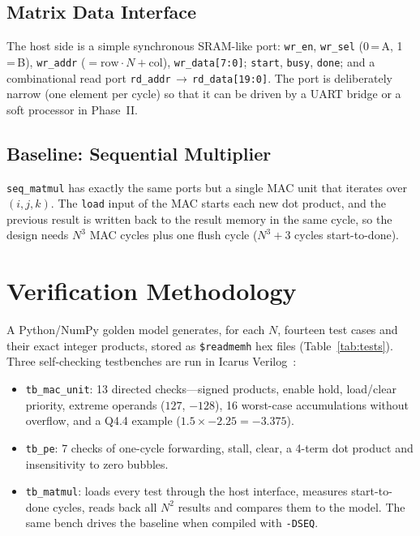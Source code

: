 \documentclass[conference]{IEEEtran}
\begin{document}
\subsection{Matrix Data Interface}
The host side is a simple synchronous SRAM-like port:
\texttt{wr\_en}, \texttt{wr\_sel} (0\,=\,A, 1\,=\,B), \texttt{wr\_addr}
($=\text{row}\cdot N+\text{col}$), \texttt{wr\_data[7:0]}; \texttt{start},
\texttt{busy}, \texttt{done}; and a combinational read port
\texttt{rd\_addr}\,$\rightarrow$\,\texttt{rd\_data[19:0]}. The port is deliberately
narrow (one element per cycle) so that it can be driven by a UART bridge or a
soft processor in Phase~II.

\subsection{Baseline: Sequential Multiplier}
\texttt{seq\_matmul} has exactly the same ports but a single MAC unit that
iterates over $(i,j,k)$. The \texttt{load} input of the MAC starts each new dot
product, and the previous result is written back to the result memory in the
same cycle, so the design needs $N^3$ MAC cycles plus one flush cycle
($N^3+3$ cycles start-to-done).

\section{Verification Methodology}
A Python/NumPy golden model generates, for each $N$, fourteen test cases and
their exact integer products, stored as \texttt{\$readmemh} hex files
(Table~\ref{tab:tests}). Three self-checking testbenches are run in Icarus
Verilog~\cite{icarus}:
\begin{itemize}
\item \texttt{tb\_mac\_unit}: 13 directed checks---signed products, enable
      hold, load/clear priority, extreme operands ($127$, $-128$), 16
      worst-case accumulations without overflow, and a Q4.4 example
      ($1.5\times-2.25=-3.375$).
\item \texttt{tb\_pe}: 7 checks of one-cycle forwarding, stall, clear, a
      4-term dot product and insensitivity to zero bubbles.
\item \texttt{tb\_matmul}: loads every test through the host interface,
      measures start-to-done cycles, reads back all $N^2$ results and compares
      them to the model. The same bench drives the baseline when compiled with
      \texttt{-DSEQ}.
\end{itemize}
\end{document}
